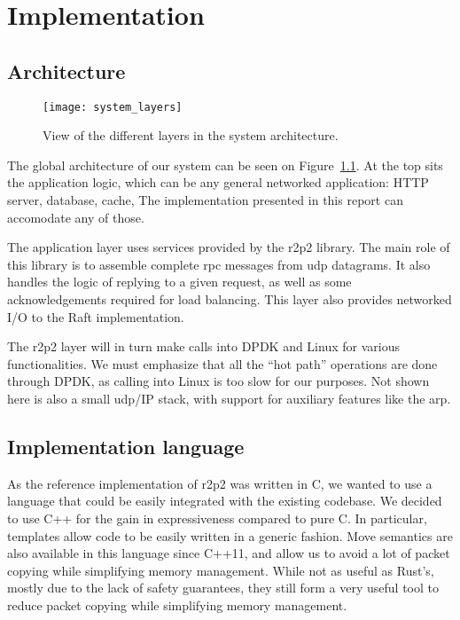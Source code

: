 \chapter{Implementation}
\label{chap:implementation}

\section{Architecture}

\begin{figure}
    \centering
    \texttt{[image: system\_layers]}
    \caption{View of the different layers in the system architecture.
    \label{fig:architecture}
    }
\end{figure}

The global architecture of our system can be seen on Figure~\ref{fig:architecture}.
At the top sits the application logic, which can be any general networked application: HTTP server, database, cache, \etc
The implementation presented in this report can accomodate any of those.

The application layer uses services provided by the \gls{r2p2} library.
The main role of this library is to assemble complete \gls{rpc} messages from \gls{udp} datagrams.
It also handles the logic of replying to a given request, as well as some acknowledgements required for load balancing.
This layer also provides networked I/O to the Raft implementation.

The \gls{r2p2} layer will in turn make calls into DPDK and Linux for various functionalities.
We must emphasize that all the ``hot path'' operations are done through DPDK, as calling into Linux is too slow for our purposes.
Not shown here is also a small \gls{udp}/IP stack, with support for auxiliary features like the \gls{arp}.


\section{Implementation language}

As the reference implementation of \gls{r2p2} was written in C, we wanted to use a language that could be easily integrated with the existing codebase.
We decided to use C++ for the gain in expressiveness compared to pure C.
In particular, templates allow code to be easily written in a generic fashion.
Move semantics are also available in this language since C++11, and allow us to avoid a lot of packet copying while simplifying memory management.
While not as useful as Rust's, mostly due to the lack of safety guarantees, they still form a very useful tool to reduce packet copying while simplifying memory management.

